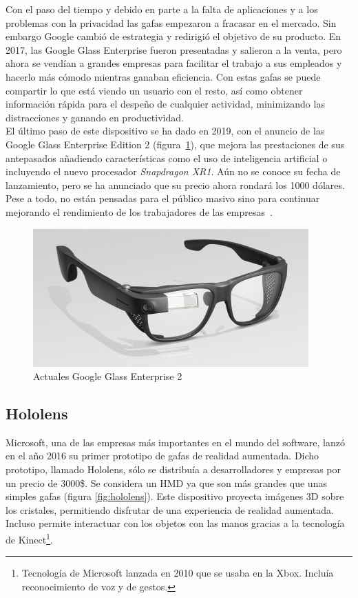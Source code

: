 Con el paso del tiempo y debido en parte a la falta de aplicaciones y a los problemas con la privacidad las gafas empezaron a fracasar en el mercado. Sin embargo Google cambió de estrategia y redirigió el objetivo de su producto. En 2017, las Google Glass Enterprise fueron presentadas y salieron a la venta, pero ahora se vendían a grandes empresas para facilitar el trabajo a sus empleados y hacerlo más cómodo mientras ganaban eficiencia. Con estas gafas se puede compartir lo que está viendo un usuario con el resto, así como obtener información rápida para el despeño de cualquier actividad, minimizando las distracciones y ganando en productividad.\\

El último paso de este dispositivo se ha dado en 2019, con el anuncio de las Google Glass Enterprise Edition 2 (figura~\ref{fig:GlassEnter}), que mejora las prestaciones de sus antepasados añadiendo características como el uso de inteligencia artificial o incluyendo el nuevo procesador \textit{Snapdragon XR1}. Aún no se conoce su fecha de lanzamiento, pero se ha anunciado que su precio ahora rondará los 1000 dólares. Pese a todo, no están pensadas para el público masivo sino para continuar mejorando el rendimiento de los trabajadores de las empresas~\cite{Andro4All}.\\ 

\begin{figure}[H]
     \centering
     \includegraphics[width=0.6\linewidth]{Images/GlassEnterprise.jpg}
     \caption[Actuales Google Glass Enterprise 2]{Actuales Google Glass Enterprise 2\footnotemark}
     \label{fig:GlassEnter}
 \end{figure}
 
\subsection{Hololens}
Microsoft, una de las empresas más importantes en el mundo del software, lanzó en el año 2016 su primer prototipo de gafas de realidad aumentada. Dicho prototipo, llamado Hololens, sólo se distribuía a desarrolladores y empresas por un precio de 3000\$. Se considera un HMD ya que son más grandes que unas simples gafas (figura \ref{fig:hololens}). Este dispositivo proyecta imágenes 3D sobre los cristales, permitiendo disfrutar de una experiencia de realidad aumentada. Incluso permite interactuar con los objetos con las manos gracias a la tecnología de Kinect\footnote{Tecnología de Microsoft lanzada en 2010 que se usaba en la Xbox. Incluía reconocimiento de voz y de gestos.}.

